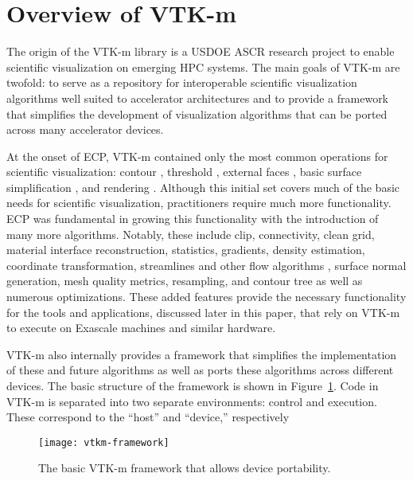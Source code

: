 \section{Overview of VTK-m}


The origin of the VTK-m library \cite{Moreland2016} is a USDOE ASCR research project to enable scientific visualization on emerging HPC systems.
The main goals of VTK-m are twofold: to serve as a repository for interoperable scientific visualization algorithms well suited to accelerator architectures and to provide a framework that simplifies the development of visualization algorithms that can be ported across many accelerator devices.

At the onset of ECP, VTK-m contained only the most common operations for scientific visualization: contour \cite{Lo2012}, threshold \cite{Maynard2013}, external faces \cite{Lessley2016}, basic surface simplification \cite{Moreland2016}, and rendering \cite{Larsen2015:VR,Larsen2015:RayTrace}.
Although this initial set covers much of the basic needs for scientific visualization, practitioners require much more functionality.
ECP was fundamental in growing this functionality with the introduction of many more algorithms.
Notably, these include clip, connectivity, clean grid, material interface reconstruction, statistics, gradients, density estimation, coordinate transformation, streamlines and other flow algorithms \cite{Pugmire2018}, surface normal generation, mesh quality metrics, resampling, and contour tree  as well as numerous optimizations.
These added features provide the necessary functionality for the tools and applications, discussed later in this paper, that rely on VTK-m to execute on Exascale machines and similar hardware.

VTK-m also internally provides a framework that simplifies the implementation of these and future algorithms as well as ports these algorithms across different devices.
The basic structure of the framework is shown in Figure~\ref{fig:vtkm-framework}.
Code in VTK-m is separated into two separate environments: control and execution.
These correspond to the ``host'' and ``device,'' respectively

\begin{figure}[htb]
  \texttt{[image: vtkm-framework]}
  \caption{The basic VTK-m framework that allows device portability.}
  \label{fig:vtkm-framework}
\end{figure}
